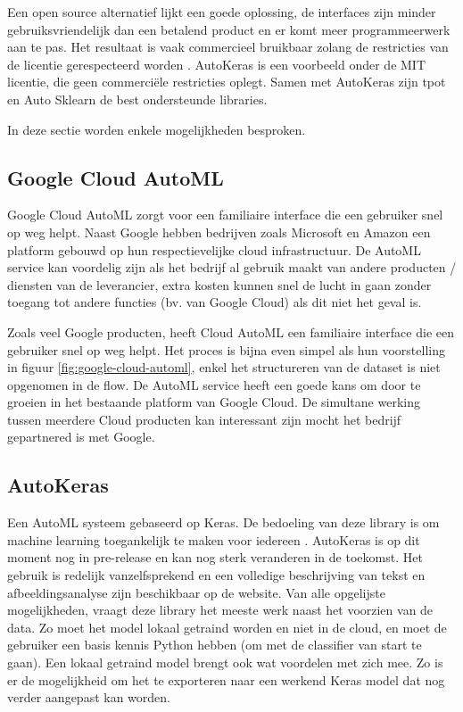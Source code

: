 Een open source alternatief lijkt een goede oplossing, de interfaces zijn minder gebruiksvriendelijk dan een betalend product en er komt meer programmeerwerk aan te pas. Het resultaat is vaak commercieel bruikbaar zolang de restricties van de licentie gerespecteerd worden \autocite{Balter2015}. AutoKeras is een voorbeeld onder de MIT licentie, die geen commerciële restricties oplegt. Samen met AutoKeras zijn tpot en Auto Sklearn de best ondersteunde libraries.

In deze sectie worden enkele mogelijkheden besproken.

\subsection{Google Cloud AutoML}

Google Cloud AutoML zorgt voor een familiaire interface die een gebruiker snel op weg helpt. Naast Google hebben bedrijven zoals Microsoft en Amazon een platform gebouwd op hun respectievelijke cloud infrastructuur. De AutoML service kan voordelig zijn als het bedrijf al gebruik maakt van andere producten / diensten van de leverancier, extra kosten kunnen snel de lucht in gaan zonder toegang tot andere functies (bv. van Google Cloud) als dit niet het geval is. 

Zoals veel Google producten, heeft Cloud AutoML een familiaire interface die een gebruiker snel op weg helpt. Het proces is bijna even simpel als hun voorstelling in figuur \ref{fig:google-cloud-automl}, enkel het structureren van de dataset is niet opgenomen in de flow. De AutoML service heeft een goede kans om door te groeien in het bestaande platform van Google Cloud. De simultane werking tussen meerdere Cloud producten kan interessant zijn mocht het bedrijf gepartnered is met Google.

\subsection{AutoKeras}

Een AutoML systeem gebaseerd op Keras. De bedoeling van deze library is om machine learning toegankelijk te maken voor iedereen \autocite{jin2019}. AutoKeras is op dit moment nog in pre-release en kan nog sterk veranderen in de toekomst. Het gebruik is redelijk vanzelfsprekend en een volledige beschrijving van tekst en afbeeldingsanalyse zijn beschikbaar op de website. Van alle opgelijste mogelijkheden, vraagt deze library het meeste werk naast het voorzien van de data. Zo moet het model lokaal getraind worden en niet in de cloud, en moet de gebruiker een basis kennis Python hebben (om met de classifier van start te gaan). Een lokaal getraind model brengt ook wat voordelen met zich mee. Zo is er de mogelijkheid om het te exporteren naar een werkend Keras model dat nog verder aangepast kan worden. 

